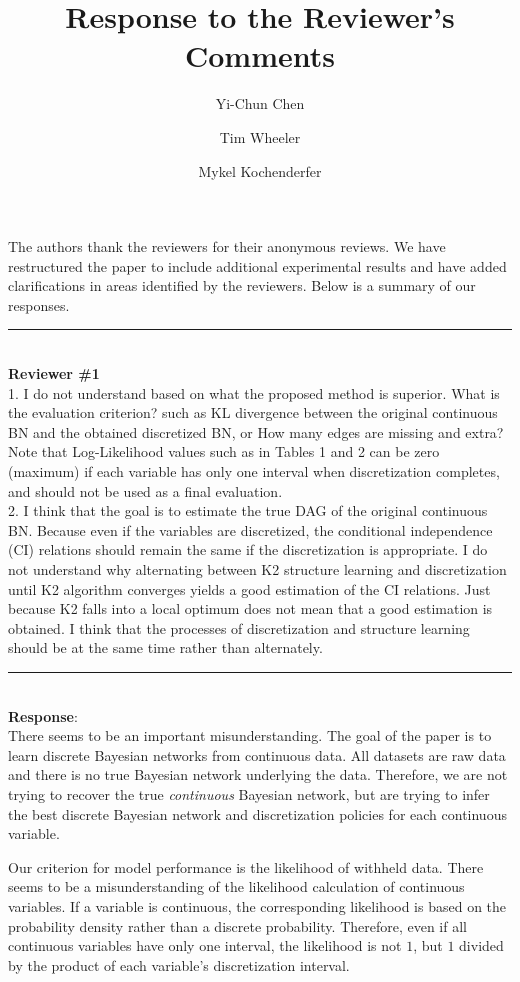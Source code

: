 \documentclass{article}
\title{Response to the Reviewer's Comments}
\author{Yi-Chun Chen \and Tim Wheeler \and Mykel Kochenderfer}
\begin{document}
\maketitle

The authors thank the reviewers for their anonymous reviews.
We have restructured the paper to include additional experimental results and have added clarifications in areas identified by the reviewers.
Below is a summary of our responses.

\noindent\rule{8cm}{0.4pt}\\
{\bf Reviewer \#1} \\

1. I do not understand based on what the proposed method is superior. What is the evaluation criterion? such as KL divergence between the original continuous BN and the obtained discretized BN, or How many edges are missing and extra? Note that Log-Likelihood values such as in Tables 1 and 2 can be zero
(maximum)  if each variable has only one interval when discretization
completes, and should not be used as a final evaluation.
\\

2. I think that the goal  is to estimate the true DAG of the original continuous BN. Because even if the variables are discretized, the conditional  independence (CI) relations should remain the same if the discretization is appropriate.  I do not understand why alternating between K2 structure learning  and discretization until K2 algorithm converges yields a good estimation of the CI relations.  Just because K2 falls into a local optimum does not mean that a good estimation is obtained.  I think that the processes of discretization and structure learning should be at the same time rather than alternately.

\noindent\rule{8cm}{0.4pt}\\
{\bf Response}:\\

There seems to be an important misunderstanding.
The goal of the paper is to learn discrete Bayesian networks from continuous data.
All datasets are raw data and there is no true Bayesian network underlying the data.
Therefore, we are not trying to recover the true \textit{continuous} Bayesian network, but are trying to infer the best discrete Bayesian network and discretization policies for each continuous variable.

Our criterion for model performance is the likelihood of withheld data.
There seems to be a misunderstanding of the likelihood calculation of continuous variables.
If a variable is continuous, the corresponding likelihood is based on the probability density rather than a discrete probability.
Therefore, even if all continuous variables have only one interval, the likelihood is not $1$, but $1$ divided by the product of each variable's discretization interval.
\end{document}
